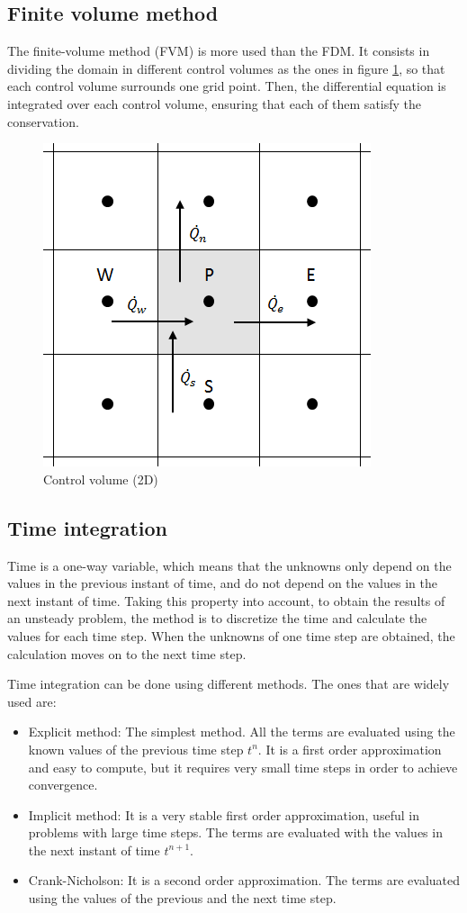 \subsection{Finite volume method}
The finite-volume method (FVM) is more used than the FDM. It consists in dividing the domain in different control volumes as the ones in figure \ref{controlvolume2d}, so that each control volume surrounds one grid point. Then, the differential equation is integrated over each control volume, ensuring that each of them satisfy the conservation.
\begin{figure}[h!]
	\centering
	\includegraphics[scale=0.5]{StateArt/controlvolume2d}
	\caption{Control volume (2D)}
	\label{controlvolume2d}
\end{figure}

\subsection{Time integration}
Time is a one-way variable, which means that the unknowns only depend on the values in the previous instant of time, and do not depend on the values in the next instant of time. Taking this property into account, to obtain the results of an unsteady problem, the method is to discretize the time and calculate the values for each time step. When the unknowns of one time step are obtained, the calculation moves on to the next time step.

Time integration can be done using different methods. The ones that are widely used are:
\begin{itemize}
	\item Explicit method: The simplest method. All the terms are evaluated using the known values of the previous time step $t^{n}$. It is a first order approximation and easy to compute, but it requires very small time steps in order to achieve convergence.
	\item Implicit method: It is a very stable first order approximation, useful in problems with large time steps. The terms are evaluated with the values in the next instant of time $t^{n+1}$.
	\item Crank-Nicholson: It is a second order approximation. The terms are evaluated using the values of the previous and the next time step.
\end{itemize}

